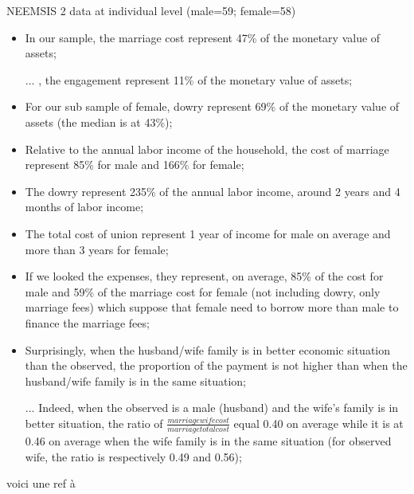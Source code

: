 \documentclass[a4paper, 11pt, onecolumn]{article}
\begin{document}
NEEMSIS 2 data at individual level (male=59; female=58)
\begin{itemize}[leftmargin=*]
\item In our sample, the marriage cost represent 47\% of the monetary value of assets;
\item [...], the engagement represent 11\% of the monetary value of assets;
\item For our sub sample of female, dowry represent 69\% of the monetary value of assets (the median is at 43\%);
\item Relative to the annual labor income of the household, the cost of marriage represent 85\% for male and 166\% for female;
\item The dowry represent 235\% of the annual labor income, around 2 years and 4 months of labor income;
\item The total cost of union represent 1 year of income for male on average and more than 3 years for female;
\item If we looked the expenses, they represent, on average, 85\% of the cost for male and 59\% of the marriage cost for female  (not including dowry, only marriage fees) which suppose that female need to borrow more than male to finance the marriage fees;
\item Surprisingly, when the husband/wife family is in better economic situation than the observed, the proportion of the payment is not higher than when the husband/wife family is in the same situation;
\item [...] Indeed, when the observed is a male (husband) and the wife's family is in better situation, the ratio of $\frac{marriage wife cost}{marriage total cost}$ equal 0.40 on average while it is at 0.46 on average when the wife family is in the same situation (for observed wife, the ratio is respectively 0.49 and 0.56);

\end{itemize}

voici une ref à 
\end{document}
